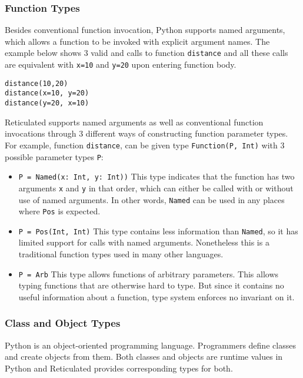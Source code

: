 

\subsubsection{Function Types}

Besides conventional function invocation, Python 
supports named arguments, which allows a function to be invoked
with explicit argument names. The example below shows 3 valid
and calls to function \texttt{distance}
and all these calls are equivalent with
\texttt{x=10} and \texttt{y=20} upon entering function body.

\begin{verbatim}
distance(10,20)
distance(x=10, y=20)
distance(y=20, x=10)
\end{verbatim}

Reticulated supports named arguments as well as conventional 
function invocations through 3 different ways of constructing
function parameter types. For example,
function \texttt{distance}, can be given type \texttt{Function(P, Int)} with 3 possible parameter types \texttt{P}:


\begin{itemize}
	\item \texttt{P = Named(x: Int, y: Int))} This type
	indicates that the function has two arguments \texttt{x} and \texttt{y} in that order, which can either be called with or without use of named arguments. In other words, \texttt{Named} can be used in any places where \texttt{Pos} is expected.
	
	\item \texttt{P = Pos(Int, Int)} This type contains less
	information than \texttt{Named}, so it has limited support for
	calls with named arguments. Nonetheless this is a traditional
	function types used in many other languages.
	
	\item \texttt{P = Arb} This type allows functions of arbitrary
	parameters. This allows typing functions that are otherwise
	hard to type. But since it contains no useful information
	about a function, type system enforces no invariant on it.
\end{itemize}

\subsubsection{Class and Object Types}

Python is an object-oriented programming language.
Programmers define classes and create objects from them.
Both classes and objects are runtime values in Python
and Reticulated provides corresponding types for both.

